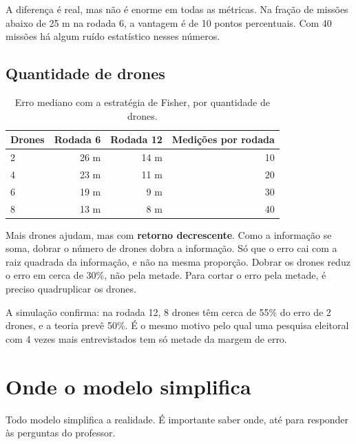 \documentclass[11pt,a4paper]{article}
\begin{document}
A diferença é real, mas não é enorme em todas as métricas. Na fração de missões abaixo de 25 m na rodada 6, a vantagem é de 10 pontos percentuais. Com 40 missões há algum ruído estatístico nesses números.

\subsection{Quantidade de drones}
\begin{table}[htbp]
\centering
\small
\begin{tabular}{@{}lrrr@{}}
\toprule
Drones & Rodada 6 & Rodada 12 & Medições por rodada \\
\midrule
2 & 26 m & 14 m & 10 \\
4 & 23 m & 11 m & 20 \\
6 & 19 m & 9 m & 30 \\
8 & 13 m & 8 m & 40 \\
\bottomrule
\end{tabular}
\caption{Erro mediano com a estratégia de Fisher, por quantidade de drones.}
\end{table}

Mais drones ajudam, mas com \textbf{retorno decrescente}. Como a informação se soma, dobrar o número de drones dobra a informação. Só que o erro cai com a raiz quadrada da informação, e não na mesma proporção. Dobrar os drones reduz o erro em cerca de 30\%, não pela metade. Para cortar o erro pela metade, é preciso quadruplicar os drones.

A simulação confirma: na rodada 12, 8 drones têm cerca de 55\% do erro de 2 drones, e a teoria prevê 50\%. É o mesmo motivo pelo qual uma pesquisa eleitoral com 4 vezes mais entrevistados tem só metade da margem de erro.

\section{Onde o modelo simplifica}

Todo modelo simplifica a realidade. É importante saber onde, até para responder às perguntas do professor.
\end{document}
